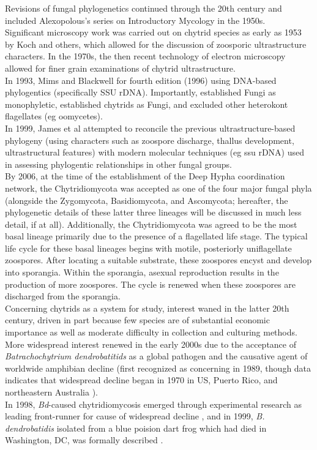 \indent Revisions of fungal phylogenetics continued through the 20th century and included Alexopolous's series on Introductory Mycology in the 1950s.\\
\indent Significant microscopy work was carried out on chytrid species as early as 1953 by Koch and others, which allowed for the discussion of zoosporic ultrastructure characters. In the 1970s, the then recent technology of electron microscopy allowed for finer grain examinations of chytrid ultrastructure.\\
\indent In 1993, Mims and Blackwell for fourth edition (1996) using DNA-based phylogentics (specifically SSU rDNA). Importantly, established Fungi as monophyletic, established chytrids as Fungi, and excluded other heterokont flagellates (eg oomycetes).\\
\indent In 1999, James et al attempted to reconcile the previous ultrastructure-based phylogeny (using characters such as zoospore discharge, thallus development, ultrastructural features) with modern molecular techniques (eg ssu rDNA) used in assessing phylogentic relationships in other fungal groups.\\
\indent By 2006, at the time of the establishment of the Deep Hypha coordination network, the Chytridiomycota was accepted as one of the four major fungal phyla (alongside the Zygomycota, Basidiomycota, and Ascomycota; hereafter, the phylogenetic details of these latter three lineages will be discussed in much less detail, if at all). Additionally, the Chytridiomycota was agreed to be the most basal lineage primarily due to the presence of a flagellated life stage. The typical life cycle for these basal lineages begins with motile, posteriorly uniflagellate zoospores. After locating a suitable substrate, these zoospores encyst and develop into sporangia. Within the sporangia, asexual reproduction results in the production of more zoospores. The cycle is renewed when these zoospores are discharged from the sporangia.\\
\indent Concerning chytrids as a system for study, interest waned in the latter 20th century, driven in part because few species are of substantial economic importance \cite{James1999} as well as moderate difficulty in collection and culturing methods. More widespread interest renewed in the early 2000s due to the acceptance of \textit{Batrachochytrium dendrobatitids} as a global pathogen and the causative agent of worldwide amphibian decline (first recognized as concerning in 1989, though data indicates that widespread decline began in 1970 in US, Puerto Rico, and northeastern Australia \cite{Stuart2004}). \\
\indent In 1998, \textit{Bd}-caused chytridiomycosis emerged through experimental research as leading front-runner for cause of widespread decline \cite{Berger1998}, and in 1999, \textit{B. dendrobatidis} isolated from a blue poision dart frog which had died in Washington, DC, was formally described \cite{Longcore1999}. \\
